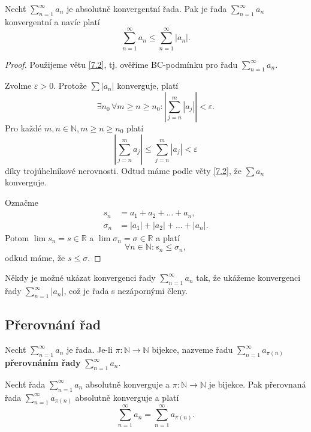 \begin{veta}\label{veta7.12}
Nechť $\sum_{n=1}^{\infty} a_n$ je absolutně konvergentní řada. Pak je řada
$
\sum_{n=1}^{\infty} a_n
$
konvergentní a navíc platí
\[
\sum_{n=1}^{\infty} a_n \leq \sum_{n=1}^{\infty} |a_n|.
\]
\end{veta}

\begin{proof}
	Použijeme větu \ref{7.2}, tj. ověříme BC-podmínku pro řadu $\sum_{n=1}^\infty a_n$.
	\par Zvolme $\varepsilon > 0$. Protože $\sum |a_n|$ konverguje, platí
	$$
	    \exists n_0 \, \forall m \geq n \geq n_0: \left | \sum_{j=n}^m |a_j| \right | < \varepsilon.
	$$
	Pro každé $m,n \in \mathbb N , m \geq n \geq n_0$ platí
	$$
	\left | \sum_{j=n}^m a_j  \right | \leq \sum _{j=n}^m |a_j| < \varepsilon
	$$
	díky trojúhelníkové nerovnosti. Odtud máme podle věty \ref{7.2}, že $\sum a_n$ konverguje.
	\par Označme
	\begin{align*}
	s_n &= a_1 + a_2 + \dots + a_n,\\
		\sigma_n &= |a_1| +|a_2| + \dots + |a_n|.
\end{align*}
	Potom $\lim s_n = s \in \mathbb R $ a $\lim \sigma_n = \sigma \in \mathbb R $ a platí
	$$
	\forall n \in \mathbb N : s_n \leq \sigma _n,
	$$
	odkud máme, že $s \leq \sigma$.
\end{proof}

\begin{poznamka}
Někdy je možné ukázat konvergenci řady $\sum_{n=1}^\infty a_n$ tak, že ukážeme konvergenci
řady $\sum_{n=1}^\infty |a_n|$, což je řada s nezápornými členy.
\end{poznamka}

\subsection{Přerovnání řad}
\begin{definice}
Nechť $\sum_{n=1}^{\infty} a_n$ je řada. Je-li $\pi : \mathbb{N} \to \mathbb{N}$ bijekce, nazveme řadu
$
\sum_{n=1}^{\infty} a_{\pi(n)}
$
\textbf{přerovnáním řady} $\sum_{n=1}^{\infty} a_n$.
\end{definice}

\begin{veta}\label{veta7.13}
Nechť řada $\sum_{n=1}^{\infty} a_n$ absolutně konverguje a $\pi : \mathbb{N} \to \mathbb{N}$ je bijekce. Pak přerovnaná řada
$
\sum_{n=1}^{\infty} a_{\pi(n)}
$
absolutně konverguje a platí
\[
\sum_{n=1}^{\infty} a_n = \sum_{n=1}^{\infty} a_{\pi(n)}.
\]
\end{veta}

